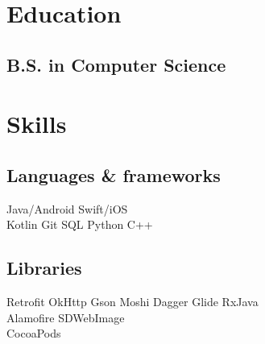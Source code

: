 \documentclass[]{Resume}
\begin{document}
%
%
\lastupdated

%
%

%
%

\begin{minipage}[t]{0.33\textwidth} 


\section{Education} 

\subsection{B.S. in Computer Science}
\sectionsep

\section{Skills}
\subsection{Languages \& frameworks}
Java/Android \textbullet{}   Swift/iOS \\
Kotlin \textbullet{} Git \textbullet{} SQL \textbullet{} Python \textbullet{} C++ \\
\sectionsep

\subsection{Libraries}
Retrofit \textbullet{} OkHttp \textbullet{} Gson \textbullet{} Moshi  \textbullet{} 
Dagger \textbullet{} Glide \textbullet{} RxJava \\
Alamofire \textbullet{} SDWebImage \textbullet{} \\
CocoaPods
\sectionsep


\end{minipage}
\end{document}
